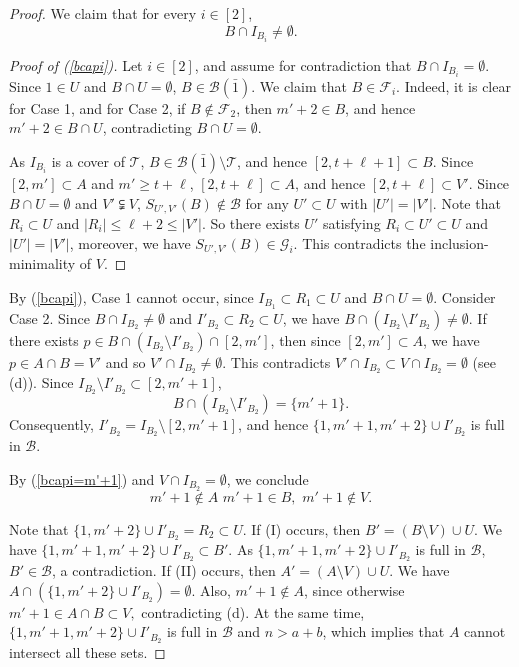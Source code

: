 \documentclass[11pt]{article}
\def\marrow{{\boldmath {\marginpar[\hfill$\rightarrow \rightarrow$]{$\leftarrow \leftarrow$}}}}
\def\andrey#1{{\sc Andrey: }{\marrow\sf \textcolor{blue}{#1}}}
\newcommand{\m}{\mathcal}
\begin{document}
\begin{proof}
We claim that for every $i\in [2]$, 
\begin{equation}\label{bcapi}
   B\cap I_{B_i}\ne \emptyset.
\end{equation}
\begin{proof}[Proof of (\ref{bcapi})]
Let $i\in [2]$, and assume for contradiction that $B\cap I_{B_i}= \emptyset$. 
Since $1\in U$ and $B\cap U=\emptyset$, $B\in \m B(\bar1)$.
We claim that $B\in \m F_i$. Indeed, it is clear for Case 1, and for Case 2, if $B\not\in \m F_2$, then $m'+2\in B$, and hence $m'+2\in B\cap U$, contradicting $B\cap U=\emptyset$.

As $I_{B_i}$ is a cover of $\m T$, $B\in \m B(\bar1)\setminus \m T$, and hence $[2,t+\ell +1]\subset B$. 
Since $[2,m']\subset A$ and $m'\ge t+\ell$, 
$[2,t+\ell]\subset A$, and hence $[2,t+\ell]\subset V'$.
Since $B\cap U=\emptyset$ and $V'\subsetneqq V$, $S_{U',V'}(B)\not\in \m B$ for any $U'\subset U$ with $|U'|=|V'|$. Note that $R_i\subset U$ and $|R_i|\le \ell+2\le |V'|$. 
So there exists $U'$ satisfying $R_i\subset U'\subset U$ and $|U'|=|V'|$, moreover, we have $S_{U',V'}(B)\in \m G_i$. This contradicts the inclusion-minimality of $V$.   
\end{proof}

By (\ref{bcapi}),
Case 1 cannot occur, since $I_{B_1}\subset R_1\subset U$ and $B\cap U=\emptyset$.
Consider Case 2.
Since $B\cap I_{B_2}\ne \emptyset$ and $I'_{B_2}\subset R_2\subset U$, we have $B\cap (I_{B_2}\setminus I'_{B_2})\ne \emptyset$.
If there exists $p\in B\cap (I_{B_2}\setminus I'_{B_2})\cap [2,m']$, then since $[2,m']\subset A$, we have $p\in A\cap B=V'$ and so $V'\cap I_{B_2}\ne \emptyset$. This contradicts $V'\cap I_{B_2}\subset V\cap I_{B_2}= \emptyset$ (see (d)). 
Since $I_{B_2}\setminus I'_{B_2} \subset [2,m'+1]$,
\begin{equation}\label{bcapi=m'+1}
 B\cap (I_{B_2}\setminus I'_{B_2} )=\{m'+1\}.   
\end{equation}
Consequently, $I'_{B_2}=I_{B_2}\setminus [2,m'+1]$, and hence 
$\{1,m'+1,m'+2\}\cup I'_{B_2}$ is full in $\m B$. 


By (\ref{bcapi=m'+1}) and $V\cap I_{B_2}=\emptyset$, we conclude 
\begin{equation}\label{5-30}
m'+1\not\in A\,\, m'+1\in B, \,\,m'+1\not\in V.    
\end{equation}


Note that $\{1,m'+2\}\cup I'_{B_2}=R_2\subset U$. 
If (I) occurs, then $B'=(B \setminus V)\cup U$.  We have 
$\{1,m'+1,m'+2\}\cup I'_{B_2}\subset B'$. 
As $\{1,m'+1,m'+2\}\cup I'_{B_2}$ is full in $\m B$, $B'\in \m B$, a contradiction.
If (II) occurs, then $A'=(A \setminus V)\cup U$. 
We have $A\cap (\{1,m'+2\}\cup I'_{B_2})=\emptyset$.  Also, $m'+1\notin A$, since otherwise $m'+1\in A\cap B\subset V,$ contradicting (d).  
At the same time, $\{1,m'+1,m'+2\}\cup I'_{B_2}$ is full in $\m B$ and $n>a+b$, which implies that $A$ cannot intersect all these sets.


\end{proof}
\end{document}
